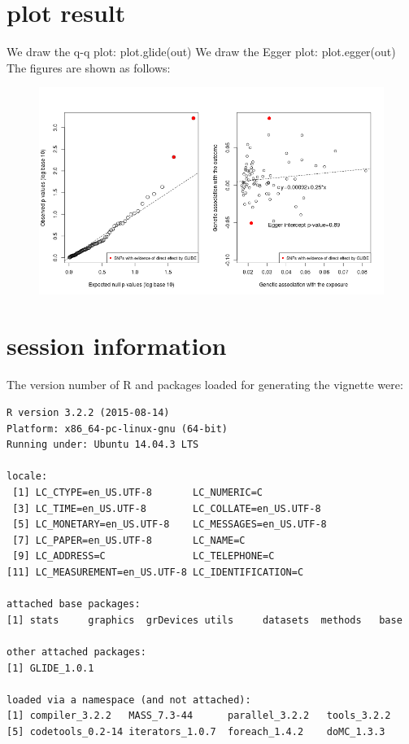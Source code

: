 \documentclass[12pt]{article}
\newcommand{\R}{{\textsf{R}}}
\begin{document}
\section{plot result}
We draw the q-q plot: plot.glide(out)
We draw the Egger plot: plot.egger(out)
The figures are shown as follows:
\begin{figure}[h]\includegraphics{./plot.png}\end{figure}
\section{session information}

The version number of \R{} and packages loaded for generating the vignette were:

\begin{verbatim}
R version 3.2.2 (2015-08-14)
Platform: x86_64-pc-linux-gnu (64-bit)
Running under: Ubuntu 14.04.3 LTS

locale:
 [1] LC_CTYPE=en_US.UTF-8       LC_NUMERIC=C              
 [3] LC_TIME=en_US.UTF-8        LC_COLLATE=en_US.UTF-8    
 [5] LC_MONETARY=en_US.UTF-8    LC_MESSAGES=en_US.UTF-8   
 [7] LC_PAPER=en_US.UTF-8       LC_NAME=C                 
 [9] LC_ADDRESS=C               LC_TELEPHONE=C            
[11] LC_MEASUREMENT=en_US.UTF-8 LC_IDENTIFICATION=C       

attached base packages:
[1] stats     graphics  grDevices utils     datasets  methods   base     

other attached packages:
[1] GLIDE_1.0.1

loaded via a namespace (and not attached):
[1] compiler_3.2.2   MASS_7.3-44      parallel_3.2.2   tools_3.2.2     
[5] codetools_0.2-14 iterators_1.0.7  foreach_1.4.2    doMC_1.3.3      \end{verbatim}

% 
% 
\end{document}
